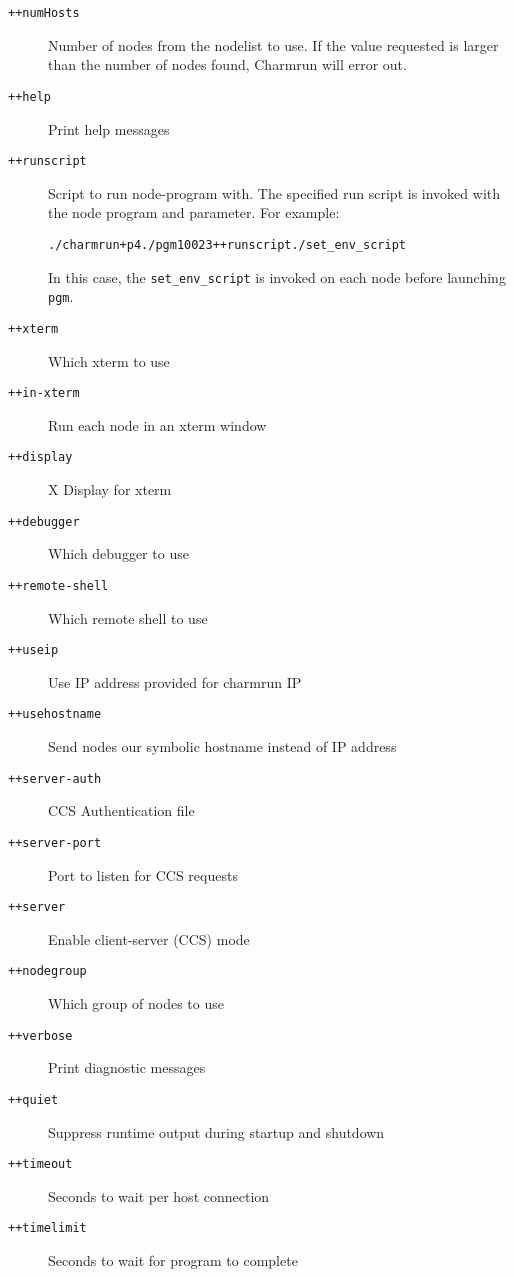 \begin{description}
\item[{\tt ++numHosts}] Number of nodes from the nodelist to use. If the value requested is larger than the number of nodes found, Charmrun will error out.

\item[{\tt ++help}]             Print help messages

\item[{\tt ++runscript}]        Script to run node-program with. The specified run script is invoked with the node program and parameter. For example:

\begin{alltt}
./charmrun +p4 ./pgm 100 2 3 ++runscript ./set\_env\_script
\end{alltt}

In this case, the {\tt set\_env\_script} is invoked on each node before launching {\tt pgm}.

\item[{\tt ++xterm}]            Which xterm to use

\item[{\tt ++in-xterm}]         Run each node in an xterm window

\item[{\tt ++display}]          X Display for xterm

\item[{\tt ++debugger}]         Which debugger to use

\item[{\tt ++remote-shell}]     Which remote shell to use

\item[{\tt ++useip}]            Use IP address provided for charmrun IP

\item[{\tt ++usehostname}]      Send nodes our symbolic hostname instead of IP address



\item[{\tt ++server-auth}]      CCS Authentication file

\item[{\tt ++server-port}]      Port to listen for CCS requests

\item[{\tt ++server}]           Enable client-server (CCS) mode

\item[{\tt ++nodegroup}]        Which group of nodes to use

\item[{\tt ++verbose}]          Print diagnostic messages

\item[{\tt ++quiet}]            Suppress runtime output during startup and shutdown

\item[{\tt ++timeout}]          Seconds to wait per host connection

\item[{\tt ++timelimit}]        Seconds to wait for program to complete

\end{description}

